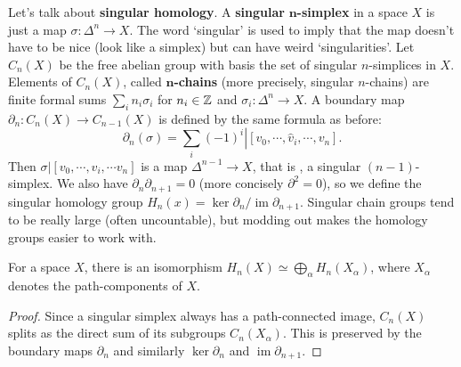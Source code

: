 Let's talk about \textbf{singular homology}. A \textbf{singular} $\mathbf{n}$\textbf{-simplex} in a space $X$ is just a map $\sigma \colon \Delta ^n  \to X$. The word `singular' is used to imply that the map doesn't have to be nice (look like a simplex) but can have weird `singularities'. Let $C_n (X)$ be the free abelian group with basis the set of singular $n$-simplices in $X$. Elements of $C_n (X)$, called $\mathbf{n}$\textbf{-chains} (more precisely, singular $n$-chains) are finite formal sums $\sum_{i}^{} n_i \sigma_i $ for $n_i \in \mathbb{Z}$ and $\sigma_i \colon \Delta ^n  \to X$. A boundary map $\partial_n \colon C_n (X) \to C_{n-1}(X) $ is defined by the same formula as before: \[
    \partial _n (\sigma)=  \sum_{i}^{}\left. (-1)^i \right| [v_0,\cdots ,\hat{v}_i ,\cdots ,v_n ].
    \] Then $\left. \sigma \right| [v_0,\cdots ,\hat{v}_i ,\cdots v_n ]$ is a map $\Delta ^{n-1}\to X$, that is , a singular $(n-1)$-simplex. We also have $\partial _n \partial _{n+1}=0$ (more concisely $\partial ^2=0$), so we define the singular homology group $H_n (x)= \ker \partial _n  / \operatorname{im}\partial _{n+1}$. Singular chain groups tend to be really large (often uncountable), but modding out makes the homology groups easier to work with. 
        
        \begin{prop}\label{dsum}
    For a space $X$, there is an isomorphism $H_n (X)\simeq \bigoplus_{\alpha }H_n (X_{\alpha })$, where $X_{\alpha }$ denotes the path-components of $X$.
\end{prop}
\begin{proof}
    Since a singular simplex always has a path-connected image, $C_n (X)$ splits as the direct sum of its subgroups $C_n (X_{\alpha })$. This is preserved by the boundary maps $\partial _n $ and similarly $\ker \partial _n $ and $\operatorname{im}\partial _{n+1}$.
\end{proof}

